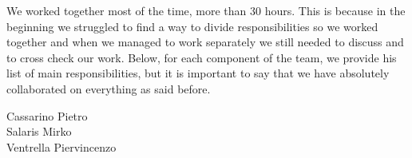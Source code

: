 We worked together most of the time, more than 30 hours. This is because in the beginning we struggled to find a way to divide responsibilities so we worked together and when we managed to work separately we still needed to discuss and to cross check our work.\newline
Below, for each component of the team, we provide his list of main responsibilities, but it is important to say that we have absolutely collaborated on everything as said before.

\begin{description}
	\item[Cassarino Pietro] %
	\item[Salaris Mirko] %
	\item[Ventrella Piervincenzo] %
\end{description}